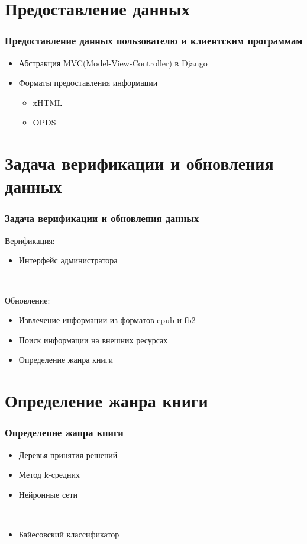 \documentclass[utf8,handout]{beamer}
\begin{document}
\section{Предоставление данных}
  \begin{frame}
    \frametitle{Предоставление данных пользователю и клиентским программам}  
    
	\begin{itemize}
      \item Абстракция MVC(Model-View-Controller) в Django
      \item Форматы предоставления информации
          \begin{itemize}
            \item xHTML
            \item OPDS
          \end{itemize}        

    \end{itemize}        
    
  \end{frame}



\section{Задача верификации и обновления данных}
  \begin{frame}
    \frametitle{Задача верификации и обновления данных}
  
    Верификация:
    \begin{itemize}
      \item Интерфейс администратора
    \end{itemize}

    \ 
    
  	Обновление:
    \begin{itemize}
      \item Извлечение информации из форматов epub и fb2 
      \item Поиск информации на внешних ресурсах
      \item Определение жанра книги
    \end{itemize}

  \end{frame}
  

\section{Определение жанра книги}
  \begin{frame}
    \frametitle{Определение жанра книги}  
    
    \begin{itemize}
      \item Деревья принятия решений
      \item Метод k-средних
      \item Нейронные сети
		
	  \ 
		
      \item Байесовский классификатор
    \end{itemize}        
  \end{frame}
\end{document}
